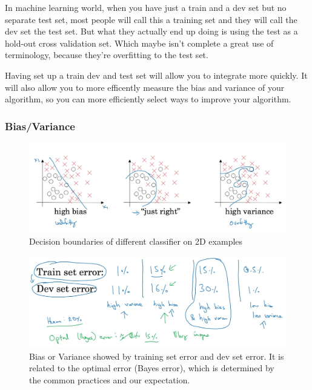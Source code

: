 \documentclass[UTF8]{article}
\begin{document}
In machine learning world, when you have just a train and a dev set but no separate test set, most
people will call this a training set and they will call the dev set the test set. But what they
actually end up doing is using the test as a hold-out cross validation set. Which maybe isn't
complete a great use of terminology, because they're overfitting to the test set.

Having set up a train dev and test set will allow you to integrate more quickly. It will also allow
you to more efficently measure the bias and variance of your algorithm, so you can more efficiently
select ways to improve your algorithm.

\subsubsection{Bias/Variance}
\begin{figure}[htb]
    \centering
    \includegraphics[width=40em]{figures/bias-and-variance-1}
    \caption{Decision boundaries of different classifier on 2D examples}
\end{figure}

\begin{figure}[htb]
    \centering
    \includegraphics[width=40em]{figures/bias-and-variance-2}
    \caption{Bias or Variance showed by training set error and dev set error. It is related to the
    optimal error (Bayes error), which is determined by the common practices and our expectation.}
\end{figure}
\end{document}

